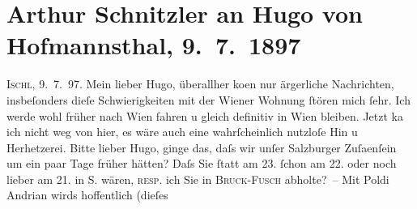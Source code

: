 

         
         \renewcommand{\erwaehntePersonen}{Personen: Leopold von Andrian-Werburg, Hugo von Hofmannsthal}
         \renewcommand{\erwaehnteOrte}{Orte: Bad Ischl, Bruck an der Großglocknerstraße, Fusch an der Großglocknerstraße, Salzburg, Wien}
         \renewcommand{\erwaehnteWerke}{}
               \section[Arthur Schnitzler an Hugo von Hofmannsthal, 9. 7. 1897]{ Arthur Schnitzler an Hugo von Hofmannsthal, 9. 7. 1897}\nopagebreak{}\rehead{ }\begin{ledgroupsized}[t]{13cm}\normalsize\beginnumbering{} \toendnotes[C]{\smallbreak\pagebreak[2]} 
\pstart
           \raggedleft{}{\pb}\textsc{Ischl}, 9. 7. 97.\pend
           \pstart
           Mein lieber Hugo, überallher ko{\geminationm}en nur
               ärgerliche Nachrichten, insbeſonders dieſe Schwierigkeiten mit der Wiener Wohnung ſtören mich ſehr. Ich werde wohl früher nach Wien fahren u gleich definitiv in Wien bleiben.\pend
           \pstart
           Jetzt ka{\geminationn} ich nicht weg von hier, es wäre auch eine
               wahrſcheinlich nutzloſe Hin u Herhetzerei. {\pb}Bitte lieber
               Hugo, ginge das, daſs wir unſer Salzburger Zuſa{\geminationm}enſein um ein paar Tage früher hätten? Daſs Sie ſtatt
               am 23.{ }ſchon am 22. oder noch lieber am
                  21. in S. wären, \textsc{resp.} ich Sie in \textsc{Bruck}-\textsc{Fusch} abholte? –\pend
           \pstart
           Mit Poldi Andrian wirds hoffentlich (dieſes

\end{ledgroupsized}
